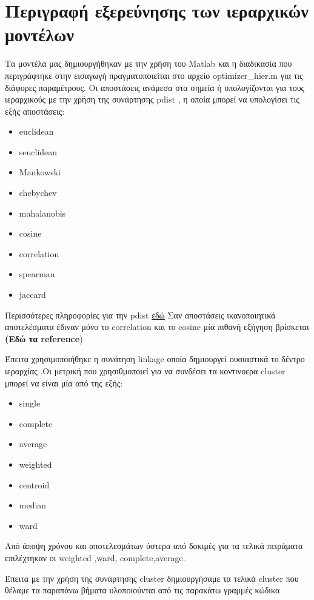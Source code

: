\section{Περιγραφή εξερεύνησης των ιεραρχικών μοντέλων}

Τα μοντέλα μας δημιουργήθηκαν με την χρήση του Matlab και η διαδικασία που περιγράφτηκε στην εισαγωγή πραγματοποιείται στο αρχείο optimizer\_hier.m
για τις διάφορες παραμέτρους. Οι αποστάσεις ανάμεσα στα σημεία ή υπολογίζονται για τους ιεραρχικούς με την χρήση της συνάρτησης pdist , η οποία μπορεί να υπολογίσει τις εξής αποστάσεις:
\begin{itemize}
	\item euclidean
	\item seuclidean
	\item Mankowski
	\item chebychev
	\item mahalanobis
	\item cosine
	\item correlation
	\item spearman
	\item jaccard 
\end{itemize}


Περισσότερες πληροφορίες για την pdist \href{http://www.mathworks.com/help/stats/pdist.html}{εδώ}
Σαν αποστάσεις ικανοποιητικά αποτελέσματα έδιναν μόνο το correlation και το 
cosine  μία πιθανή εξήγηση βρίσκεται \textbf{(Εδώ τα reference})

Έπειτα χρησιμοποιήθηκε η συνάτηση linkage οποία δημιουργεί ουσιαστικά το δέντρο ιεραρχίας .Οι μετρική που χρησιθμοποιεί για να συνδέσει τα κοντινοερα cluster μπορεί να είναι μία από της εξής:
\begin{itemize}
  	\item single
  	\item complete
  	\item average
  	\item weighted
  	\item centroid
  	\item median
  	\item ward 
  \end{itemize}

Από άποψη χρόνου και αποτελεσμάτων ύστερα από δοκιμές για τα τελικά πειράματα επιλέχτηκαν οι weighted ,ward, complete,average.

Έπειτα με την χρήση της συνάρτησης cluster δημιουργήσαμε τα τελικά cluster που θέλαμε τα παραπάνω βήματα υλοποιούνται από τις παρακάτω γραμμές κώδικα 


